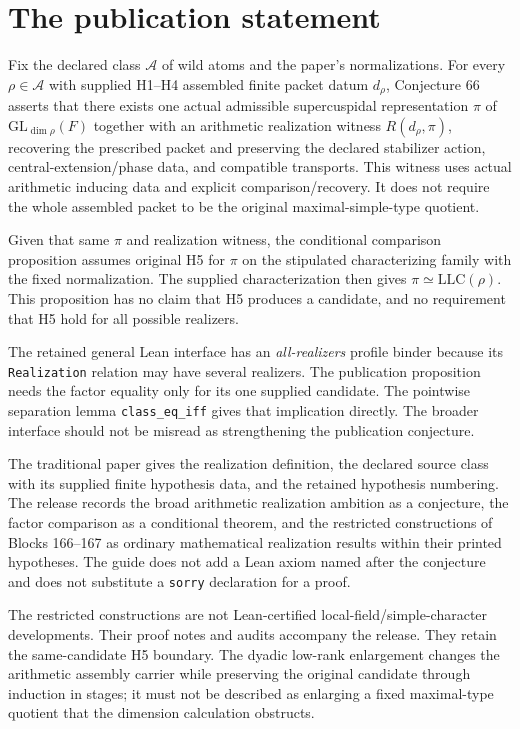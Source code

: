 \documentclass[10pt,oneside]{book}
\begin{document}

\section{The publication statement}
Fix the declared class \(\mathcal A\) of wild atoms and the paper's normalizations. For every \(\rho\in\mathcal A\) with supplied H1--H4 assembled finite packet datum \(d_\rho\), Conjecture 66 asserts that there exists one actual admissible supercuspidal representation \(\pi\) of \(\mathrm{GL}_{\dim\rho}(F)\) together with an arithmetic realization witness \(R(d_\rho,\pi)\), recovering the prescribed packet and preserving the declared stabilizer action, central-extension/phase data, and compatible transports. This witness uses actual arithmetic inducing data and explicit comparison/recovery. It does not require the whole assembled packet to be the original maximal-simple-type quotient.

Given that same \(\pi\) and realization witness, the conditional comparison proposition assumes original H5 for \(\pi\) on the stipulated characterizing family with the fixed normalization. The supplied characterization then gives \(\pi\simeq\mathrm{LLC}(\rho)\). This proposition has no claim that H5 produces a candidate, and no requirement that H5 hold for all possible realizers.

The retained general Lean interface has an \emph{all-realizers} profile binder because its \texttt{Realization} relation may have several realizers. The publication proposition needs the factor equality only for its one supplied candidate. The pointwise separation lemma \texttt{class\_eq\_iff} gives that implication directly. The broader interface should not be misread as strengthening the publication conjecture.

The traditional paper gives the realization definition, the declared source class with its supplied finite hypothesis data, and the retained hypothesis numbering. The release records the broad arithmetic realization ambition as a conjecture, the factor comparison as a conditional theorem, and the restricted constructions of Blocks 166--167 as ordinary mathematical realization results within their printed hypotheses. The guide does not add a Lean axiom named after the conjecture and does not substitute a \texttt{sorry} declaration for a proof.

The restricted constructions are not Lean-certified local-field/simple-character developments. Their proof notes and audits accompany the release. They retain the same-candidate H5 boundary. The dyadic low-rank enlargement changes the arithmetic assembly carrier while preserving the original candidate through induction in stages; it must not be described as enlarging a fixed maximal-type quotient that the dimension calculation obstructs.
\end{document}
